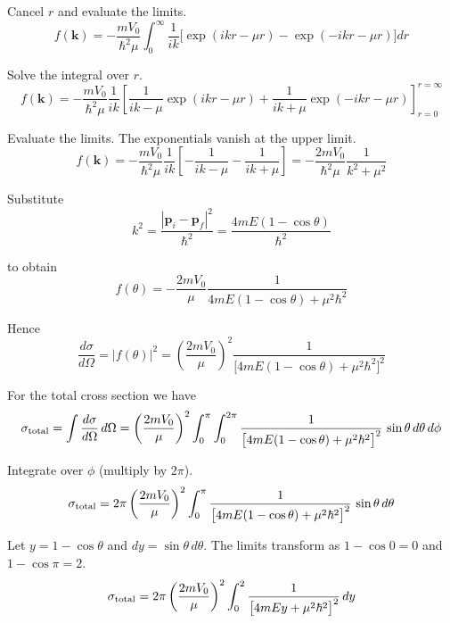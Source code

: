 Cancel $r$ and evaluate the limits.
\begin{equation*}
f(\mathbf k)=-\frac{mV_0}{\hbar^2\mu}
\int_0^\infty
\frac{1}{ik}
\bigl[\exp(ikr-\mu r)-\exp(-ikr-\mu r)\bigr]
dr
\end{equation*}

Solve the integral over $r$.
\begin{equation*}
f(\mathbf k)=-\frac{mV_0}{\hbar^2\mu}
\frac{1}{ik}
\left[
\frac{1}{ik-\mu}
\exp(ikr-\mu r)
+\frac{1}{ik+\mu}
\exp(-ikr-\mu r)
\right]_{r=0}^{r=\infty}
\end{equation*}

Evaluate the limits. The exponentials vanish at the upper limit.
\begin{equation*}
f(\mathbf k)=-\frac{mV_0}{\hbar^2\mu}
\frac{1}{ik}
\left[
-\frac{1}{ik-\mu}
-\frac{1}{ik+\mu}
\right]
=-\frac{2mV_0}{\hbar^2\mu}\frac{1}{k^2+\mu^2}
\tag{1}
\end{equation*}

Substitute
\begin{equation*}
k^2=\frac{|\mathbf p_i-\mathbf p_f|^2}{\hbar^2}=\frac{4mE(1-\cos\theta)}{\hbar^2}
\end{equation*}

to obtain
\begin{equation*}
f(\theta)=-\frac{2mV_0}{\mu}\frac{1}{4mE(1-\cos\theta)+\mu^2\hbar^2}
\tag{2}
\end{equation*}

Hence
\begin{equation*}
\frac{d\sigma}{d\Omega}
=|f(\theta)|^2=\left(\frac{2mV_0}{\mu}\right)^2
\frac{1}{\bigl[4mE(1-\cos\theta)+\mu^2\hbar^2\bigr]^2}
\end{equation*}

For the total cross section we have
\begin{equation*}
\sigma_{\rm total}=\int\frac{d\sigma}{d\Omega}\,d\Omega
=\left(\frac{2mV_0}{\mu}\right)^2\int_0^\pi\int_0^{2\pi}
\frac{1}{\bigl[4mE(1-\cos\theta)+\mu^2\hbar^2\bigr]^2}\,\sin\theta\,d\theta\,d\phi
\end{equation*}

Integrate over $\phi$ (multiply by $2\pi$).
\begin{equation*}
\sigma_{\rm total}=2\pi\left(\frac{2mV_0}{\mu}\right)^2
\int_0^\pi\frac{1}{\bigl[4mE(1-\cos\theta)+\mu^2\hbar^2\bigr]^2}\,\sin\theta\,d\theta
\end{equation*}

Let $y=1-\cos\theta$ and $dy=\sin\theta\,d\theta$.
The limits transform as $1-\cos0=0$ and $1-\cos\pi=2$.
\begin{equation*}
\sigma_{\rm total}=2\pi\left(\frac{2mV_0}{\mu}\right)^2
\int_0^2\frac{1}{\bigl[4mEy+\mu^2\hbar^2\bigr]^2}\,dy
\end{equation*}


